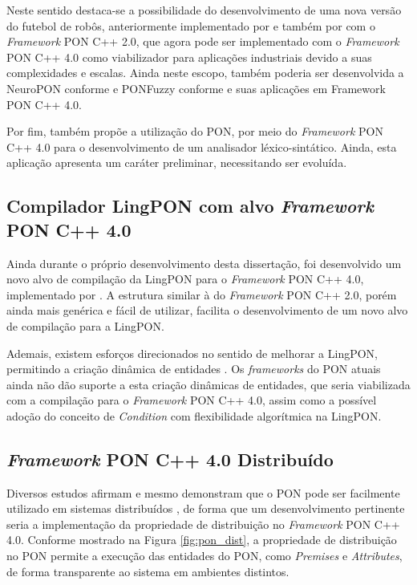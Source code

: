 Neste sentido destaca-se a possibilidade do desenvolvimento de uma nova versão
do futebol de robôs, anteriormente implementado por 
e também por  com o \textit{Framework} PON C++ 2.0, que
agora pode ser implementado com o \textit{Framework} PON C++ 4.0 como
viabilizador para aplicações industriais devido a suas complexidades e escalas.
Ainda neste escopo, também poderia ser desenvolvida a NeuroPON conforme
 e PONFuzzy conforme \cite{msc_melo_2016} e suas
aplicações em Framework PON C++ 4.0.

Por fim,  também propõe a utilização do PON, por meio do
\textit{Framework} PON C++ 4.0 para o desenvolvimento de um analisador
léxico-sintático. Ainda, esta aplicação apresenta um caráter preliminar,
necessitando ser evoluída.

\subsection{Compilador LingPON com alvo \textit{Framework} PON C++ 4.0}

Ainda durante o próprio desenvolvimento desta dissertação, foi desenvolvido um
novo alvo de compilação da LingPON para o \textit{Framework} PON C++ 4.0,
implementado por . A estrutura similar à do
\textit{Framework} PON C++ 2.0, porém ainda mais genérica e fácil de utilizar,
facilita o desenvolvimento de um novo alvo de compilação para a LingPON.

Ademais, existem esforços direcionados no sentido de melhorar a LingPON,
permitindo a criação dinâmica de entidades \cite{oshiro_2021}. Os
\textit{frameworks} do PON atuais ainda não dão suporte a esta criação dinâmicas
de entidades, que seria viabilizada com a compilação para o \textit{Framework}
PON C++ 4.0, assim como a possível adoção do conceito de \textit{Condition} com
flexibilidade algorítmica na LingPON.

\subsection{\textit{Framework} PON C++ 4.0 Distribuído}\label{sec:pon_dist}

Diversos estudos afirmam e mesmo demonstram que o PON pode ser facilmente
utilizado em sistemas distribuídos
\cite{msc_Banaszewski_2009,talau_2016,barreto_2018,oliveira_2018,msc_oliveira_2019,msc_negrini_2019,martini_2019},
de forma que um desenvolvimento pertinente seria a implementação da propriedade
de distribuição no \textit{Framework} PON C++ 4.0. Conforme mostrado na Figura
\ref{fig:pon_dist}, a propriedade de distribuição no PON permite a execução das
entidades do PON, como \textit{Premises} e \textit{Attributes}, de forma
transparente ao sistema em ambientes distintos.

